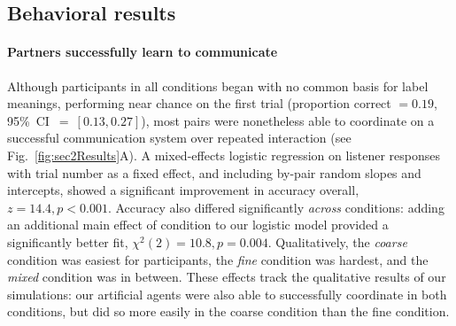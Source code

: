 \subsection{Behavioral results}

\paragraph{Partners successfully learn to communicate}

Although participants in all conditions began with no common basis for label meanings, performing near chance on the first trial (proportion correct $= 0.19$, 95\%~CI~$=~[0.13, 0.27]$), most pairs were nonetheless able to coordinate on a successful communication system over repeated interaction (see Fig.\ \ref{fig:sec2Results}A). 
A mixed-effects logistic regression on listener responses with trial number as a fixed effect, and including by-pair random slopes and intercepts, showed a significant improvement in accuracy overall, $z = 14.4, p < 0.001$. 
Accuracy also differed significantly \emph{across} conditions: adding an additional main effect of condition to our logistic model provided a significantly better fit, $\chi^2(2) = 10.8, p = 0.004$. 
Qualitatively, the \emph{coarse} condition was easiest for participants, the \emph{fine} condition was hardest, and the \emph{mixed} condition was in between.
These effects track the qualitative results of our simulations: our artificial agents were also able to successfully coordinate in both conditions, but did so more easily in the coarse condition than the fine condition. 

